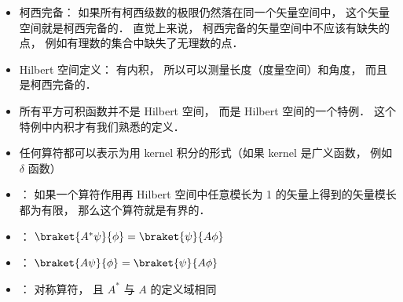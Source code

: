 
\begin{itemize}
\item 柯西完备： 如果所有柯西级数的极限仍然落在同一个矢量空间中， 这个矢量空间就是柯西完备的． 直觉上来说， 柯西完备的矢量空间中不应该有缺失的点， 例如有理数的集合中缺失了无理数的点．
\item Hilbert 空间定义： 有内积， 所以可以测量长度（度量空间）和角度， 而且是柯西完备的．
\item 所有平方可积函数并不是 Hilbert 空间， 而是 Hilbert 空间的一个特例． 这个特例中内积才有我们熟悉的定义．
\item 任何算符都可以表示为用 kernel 积分的形式（如果 kernel 是广义函数， 例如 $\delta$ 函数）
\item {}： 如果一个算符作用再 Hilbert 空间中任意模长为 1 的矢量上得到的矢量模长都为有限， 那么这个算符就是有界的．
\item {}： $\braket{A^* \psi}{\phi} = \braket{\psi}{A \phi}$
\item {}： $\braket{A \psi}{\phi} = \braket{\psi}{A \phi}$
\item {}： 对称算符， 且 $A^*$ 与 $A$ 的定义域相同
\end{itemize}
